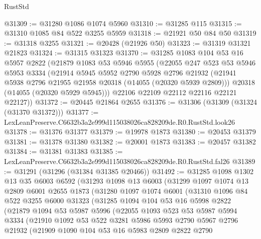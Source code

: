 \begin{lexlean}{RustStd}
\begin{coremodule}
@31309 := @31280 @1086 @1074 @5960
@31310 := @31285 @115
@31315 := @31310 @1085 @84 @522 @3255 @5959
@31318 := @21921 @50 @84 @50
@31319 := @31318 @3255
@31321 := @20428 (@21926 @50)
@31323 := @31319 @31321 @21823
@31324 := @31315 @31323
@31370 := @31285
    @1083
    @104
    @53
    @16
    @5957
    @2822
    (@21879
      @1083
      @53
      @5946
      @5955
      (@22055
        @247
        @523
        @53
        @5946
        @5953
        @3334
        (@21914
          @5945
          @5952
          @2790
          @5928
          @2796
          @21932
          (@21941 @5938 @2796 @21955 @21958 @20318 (@14055 (@20320 @5939 @2809)))
          @20318
          (@14055 (@20320 @5929 @5945)))
        @22106
        @22109
        @22112
        @22116
        @22121
        @22127))
@31372 := @20445 @21864 @2655
@31376 := @31306 (@31309 (@31324 (@31370 @31372)))
@31377 := LexLeanPreserve.C6632b3a2e999d115038026ca828209de.R0.RustStd.look26
@31378 := @31376 @31377
@31379 := @19978 @1873
@31380 := @20453 @31379
@31381 := @31378 @31380
@31382 := @20001 @1873
@31383 := @20457 @31382
@31384 := @31381 @31383
@31385 := LexLeanPreserve.C6632b3a2e999d115038026ca828209de.R0.RustStd.fal26
@31389 := @31291 (@31296 (@31384 @31385 @20466))
@31492 := @31285
    @1098
    @1302
    @13
    @35
    @6003
    @6592
    (@31293
      @1098
      @13
      @6003
      (@31299
        @1097
        @1074
        @13
        @2809
        @6001
        @2655
        @1873
        (@31280
          @1097
          @1074
          @6001
          (@31310
            @1096
            @84
            @522
            @3255
            @6000
            @31323
            (@31285
              @1094
              @104
              @53
              @16
              @5998
              @2822
              (@21879
                @1094
                @53
                @5987
                @5996
                (@22055
                  @1093
                  @523
                  @53
                  @5987
                  @5994
                  @3334
                  (@21910
                    @1092
                    @53
                    @522
                    @3281
                    @5986
                    @5993
                    @2790
                    @5967
                    @2796
                    @21932
                    (@21909
                      @1090
                      @104
                      @53
                      @16
                      @5983
                      @2809
                      @2822
                      @2790

\end{coremodule}
\end{lexlean}
